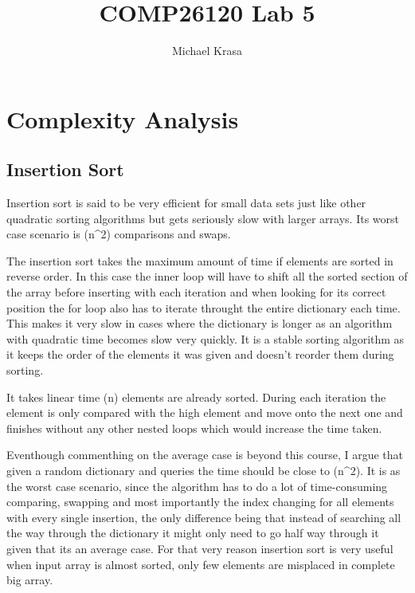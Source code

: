 \documentclass{article}
\title{COMP26120 Lab 5}
\author{Michael Krasa}
\begin{document}
\maketitle


\section{Complexity Analysis}
\label{sec:complexity}




\subsection{Insertion Sort}

Insertion sort is said to be very efficient for small data sets just like other quadratic sorting algorithms but gets seriously slow with larger arrays. Its worst case scenario is \Theta(n^2) comparisons and swaps. 

The insertion sort takes the maximum amount of time if elements are sorted in reverse order. In this case the inner loop will have to shift all the sorted section of the array before inserting with each iteration and when looking for its correct position the for loop also has to iterate throught the entire dictionary each time. This makes it very slow in cases where the dictionary is longer as an algorithm with quadratic time becomes slow very quickly. It is a stable sorting algorithm as it keeps the order of the elements it was given and doesn't reorder them during sorting.

It takes linear time \Theta(n) elements are already sorted. During each iteration the element is only compared with the high element and move onto the next one and finishes without any other nested loops which would increase the time taken.

Eventhough commenthing on the average case is beyond this course, I argue that given a random dictionary and queries the time should be close to \Theta(n^2). It is as the worst case scenario, since the algorithm has to do a lot of time-consuming comparing, swapping and most importantly the index changing for all elements with every single insertion, the only difference being that instead of searching all the way through the dictionary it might only need to go half way through it given that its an average case. For that very reason insertion sort is very useful when input array is almost sorted, only few elements are misplaced in complete big array.
\end{document}
